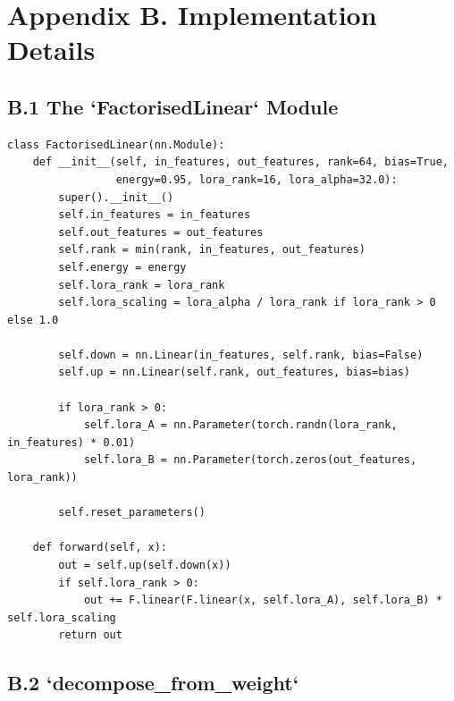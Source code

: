
\section{Appendix B. Implementation Details}

\subsection{B.1 The `FactorisedLinear` Module}

\begin{lstlisting}
class FactorisedLinear(nn.Module):
    def __init__(self, in_features, out_features, rank=64, bias=True,
                 energy=0.95, lora_rank=16, lora_alpha=32.0):
        super().__init__()
        self.in_features = in_features
        self.out_features = out_features
        self.rank = min(rank, in_features, out_features)
        self.energy = energy
        self.lora_rank = lora_rank
        self.lora_scaling = lora_alpha / lora_rank if lora_rank > 0 else 1.0
        
        self.down = nn.Linear(in_features, self.rank, bias=False)
        self.up = nn.Linear(self.rank, out_features, bias=bias)
        
        if lora_rank > 0:
            self.lora_A = nn.Parameter(torch.randn(lora_rank, in_features) * 0.01)
            self.lora_B = nn.Parameter(torch.zeros(out_features, lora_rank))
        
        self.reset_parameters()
    
    def forward(self, x):
        out = self.up(self.down(x))
        if self.lora_rank > 0:
            out += F.linear(F.linear(x, self.lora_A), self.lora_B) * self.lora_scaling
        return out
\end{lstlisting}

\subsection{B.2 `decompose\_from\_weight`}

